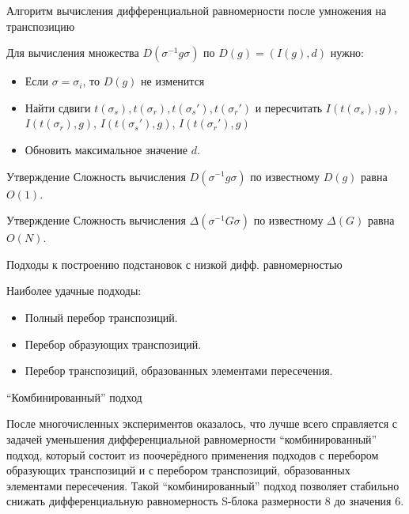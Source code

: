 \documentclass{beamer}
\begin{document}
\begin{frame}{Алгоритм вычисления дифференциальной равномерности после умножения на транспозицию}

Для вычисления множества $D(\sigma^{-1}g\sigma)$ по $D(g) = (I(g), d)$ нужно:
\begin{itemize}
\item Если $\sigma = \sigma_i$, то $D(g)$ не изменится
\item Найти сдвиги $t(\sigma_s), t(\sigma_r), t(\sigma_s'), t(\sigma_r')$ и пересчитать $I(t(\sigma_s),g)$, $I(t(\sigma_r),g)$, $I( t(\sigma_s'),g)$, $I(t(\sigma_r'),g)$
\item Обновить максимальное значение $d$.
\end{itemize}

\begin{block}{Утверждение}
 Сложность вычисления $D(\sigma^{-1}g\sigma)$ по известному $D(g)$ равна $O(1)$.
\end{block}

\begin{block}{Утверждение}
 Сложность вычисления $\Delta(\sigma^{-1} G  \sigma)$ по известному $\Delta(G)$ равна $O(N)$.
\end{block}
\end{frame}





\begin{frame}{Подходы к построению подстановок с низкой дифф. равномерностью}

Наиболее удачные подходы:

\begin{itemize}
\item Полный перебор транспозиций.
\item Перебор образующих транспозиций.
\item Перебор транспозиций, образованных элементами пересечения.
\end{itemize}

\end{frame}





\begin{frame}{``Комбинированный'' подход}

После многочисленных экспериментов оказалось, что лучше всего справляется с задачей уменьшения дифференциальной равномерности ``комбинированный'' подход, который состоит из поочерёдного применения подходов с перебором образующих транспозиций и с перебором транспозиций, образованных элементами пересечения. Такой ``комбинированный'' подход позволяет стабильно снижать дифференциальную равномерность S-блока размерности 8 до значения 6.

\end{frame}
\end{document}
